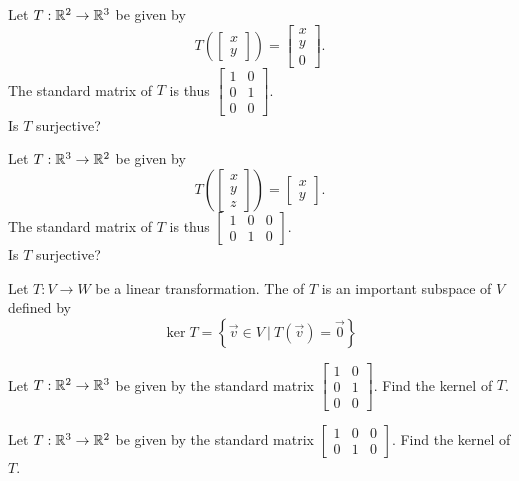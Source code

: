 \begin{applicationActivities}
\begin{activity}{5}
Let $T: \mathbb{R}^2 \rightarrow \mathbb{R}^3$ be given by $$T\left(\begin{bmatrix}x \\ y \end{bmatrix} \right) = \begin{bmatrix} x \\ y \\ 0 \end{bmatrix}.$$
The standard matrix of $T$ is thus $\begin{bmatrix} 1 & 0 \\ 0 & 1 \\ 0 & 0 \end{bmatrix}$. \\
Is $T$ surjective?
\end{activity}

\begin{activity}{5}
Let $T: \mathbb{R}^3 \rightarrow \mathbb{R}^2$ be given by $$T\left(\begin{bmatrix} x \\ y \\ z \end{bmatrix} \right) = \begin{bmatrix} x \\ y \end{bmatrix}.$$  The standard matrix of $T$ is thus $\begin{bmatrix} 1 & 0 &0  \\ 0 & 1 & 0 \end{bmatrix}$.\\
Is $T$ surjective?
\end{activity}


\begin{definition}
Let $T: V \rightarrow W$ be a linear transformation.  The  of $T$
is an important subspace of \(V\) defined by
\[
\ker T = \left\{ \vec{v} \in V\ \big|\ T(\vec{v})=\vec{0}\right\}
\]
\end{definition}

\begin{activity}{5}
Let $T: \mathbb{R}^2 \rightarrow \mathbb{R}^3$ be given by the standard matrix $\begin{bmatrix} 1 & 0 \\ 0 & 1 \\ 0 & 0 \end{bmatrix}$.  Find the kernel of $T$.
\end{activity}

\begin{activity}{5}
Let $T: \mathbb{R}^3 \rightarrow \mathbb{R}^2$ be given by the standard matrix $\begin{bmatrix} 1 & 0 &0  \\ 0 & 1 & 0 \end{bmatrix}$.  Find the kernel of $T$.
\end{activity}




\end{applicationActivities}
